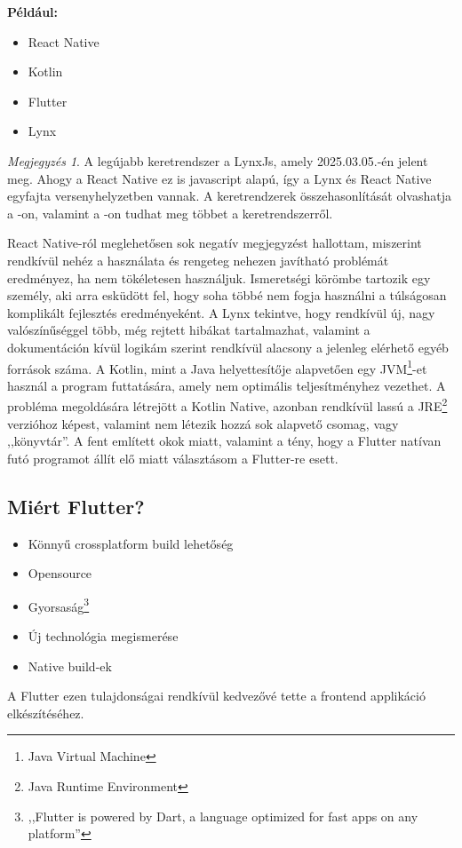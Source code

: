 \documentclass{thesis-ekf}
\theoremstyle{definition}
\theoremstyle{remark}
\newtheorem{megjegyzes}{Megjegyzés}
\begin{document}
	\textbf{Például:}
	\begin{itemize}
		\item React Native
		\item Kotlin
		\item Flutter
		\item Lynx
	\end{itemize}
	\begin{megjegyzes}
		A legújabb keretrendszer a LynxJs, amely 2025.03.05.-én jelent meg. Ahogy a React Native ez is javascript alapú, így a Lynx és React Native egyfajta versenyhelyzetben vannak. A keretrendzerek összehasonlítását olvashatja a  \href{https://medium.com/@mostsignificant/introducing-lynx-how-tiktoks-new-framework-compares-to-react-native-580a52d3462c}{\color{blue}{Medium.com}}-on, valamint a \href{https://lynxjs.org/}{\color{blue}{LynxJs.org}}-on tudhat meg többet a keretrendszerről.
	\end{megjegyzes}
	
	React Native-ról meglehetősen sok negatív megjegyzést hallottam, miszerint rendkívül nehéz a használata és rengeteg nehezen javítható problémát eredményez, ha nem tökéletesen használjuk. Ismeretségi körömbe tartozik egy személy, aki arra esküdött fel, hogy soha többé nem fogja használni a túlságosan komplikált fejlesztés eredményeként.
	A Lynx tekintve, hogy rendkívül új, nagy valószínűséggel több, még rejtett hibákat tartalmazhat, valamint a dokumentáción kívül logikám szerint rendkívül alacsony a jelenleg elérhető egyéb források száma.
	A Kotlin, mint a Java helyettesítője alapvetően egy JVM\footnote{Java Virtual Machine}-et használ a program futtatására, amely nem optimális teljesítményhez vezethet. A probléma megoldására létrejött a Kotlin Native\cite{bib_kotlin_native_home}, azonban rendkívül lassú a JRE\footnote{Java Runtime Environment} verzióhoz képest, valamint nem létezik hozzá sok alapvető csomag, vagy ,,könyvtár''\cite{bib_kotlin_native_discussion}.
	A fent említett okok miatt, valamint a tény, hogy a Flutter natívan futó programot állít elő miatt választásom a Flutter-re esett.
	\subsection{Miért Flutter?}
	\begin{itemize}
		\item Könnyű crossplatform build lehetőség
		\item Opensource
		\item Gyorsaság\footnote{,,Flutter is powered by Dart, a language optimized for fast apps on any platform''\cite{bib_flutter_web}}
		\item Új technológia megismerése
		\item Native build-ek
	\end{itemize}
	A Flutter ezen tulajdonságai rendkívül kedvezővé tette a frontend applikáció elkészítéséhez. 
\end{document}
